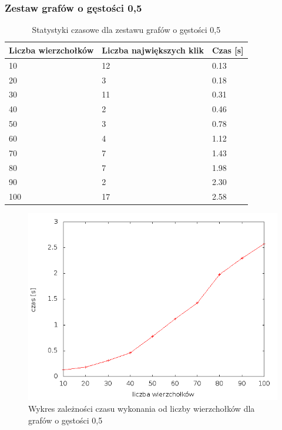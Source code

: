 \documentclass[12pt, a4paper]{article}
\begin{document}
\subsubsection*{Zestaw grafów o gęstości 0,5}
\begin{table}[H]
\caption{Statystyki czasowe dla zestawu grafów o gęstości 0,5}
\begin{center}
    \begin{tabular}{|l|l|l|}
    \hline
    Liczba wierzchołków & Liczba największych klik & Czas [s] \\ \hline
    10 & 12 & 0.13 \\ \hline
    20 & 3 & 0.18 \\ \hline
    30 & 11 & 0.31 \\ \hline
    40 & 2 & 0.46 \\ \hline
    50 & 3 & 0.78 \\ \hline
    60 & 4 & 1.12 \\ \hline
    70 & 7 & 1.43 \\ \hline
    80 & 7 & 1.98 \\ \hline
    90 & 2 & 2.30 \\ \hline
    100 & 17 & 2.58 \\ \hline
    \end{tabular}
\end{center}
\end{table}

\begin{figure}[h]
    \begin{center}
	\includegraphics[scale=0.5]{results/img/den/den_05.png}
	\caption{Wykres zależności czasu wykonania od liczby wierzchołków dla grafów o gęstości 0,5}
    \end{center}
\end{figure}
\end{document}
